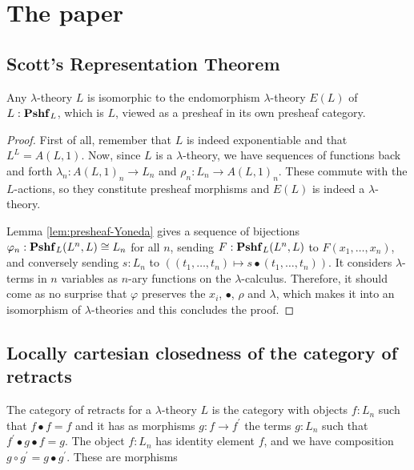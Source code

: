 \chapter{The paper}


\section{Scott's Representation Theorem}
\begin{theorem}
  Any $ \lambda $-theory $ L $ is isomorphic to the endomorphism $ \lambda $-theory $ E(L) $ of $ L: \mathbf{Pshf}_{L} $, which is $ L $, viewed as a presheaf in its own presheaf category.
\end{theorem}
\begin{proof}
  First of all, remember that $ L $ is indeed exponentiable and that $ L^L = A(L, 1) $.
  Now, since $ L $ is a $ \lambda $-theory, we have sequences of functions back and forth $ \lambda_n: A(L, 1)_n \to L_n $ and $ \rho_n: L_n \to A(L, 1)_n $. These commute with the $ L $-actions, so they constitute presheaf morphisms and $ E(L) $ is indeed a $ \lambda $-theory.

  Lemma \ref{lem:presheaf-Yoneda} gives a sequence of bijections $ \varphi_n : \mathbf{Pshf}_{L}(L^n, L) \cong L_n $ for all $ n $, sending $ F: \mathbf{Pshf}_{L}(L^n, L) $ to $ F(x_1, \dots, x_n) $, and conversely sending $ s: L_n $ to $ ((t_1, \dots, t_n) \mapsto s \bullet (t_1, \dots, t_n)) $. It considers $ \lambda $-terms in $ n $ variables as $ n $-ary functions on the $ \lambda $-calculus. Therefore, it should come as no surprise that $ \varphi $ preserves the $ x_i $, $ \bullet $, $ \rho $ and $ \lambda $, which makes it into an isomorphism of $ \lambda $-theories and this concludes the proof.
\end{proof}


\section{Locally cartesian closedness of the category of retracts}
\begin{definition}
  The category of retracts for a $ \lambda $-theory $ L $ is the category with objects $ f: L_n $ such that $ f \bullet f = f $ and it has as morphisms $ g: f \to f^\prime $ the terms $ g: L_n $ such that $ f^\prime \bullet g \bullet f = g $. The object $ f: L_n $ has identity element $ f $, and we have composition $ g \circ g^\prime = g \bullet g^\prime $. These are morphisms \TODO
\end{definition}


